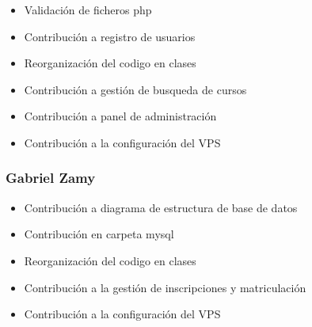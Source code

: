 \documentclass[
]{article}
\providecommand{\tightlist}{%
  \setlength{\itemsep}{0pt}\setlength{\parskip}{0pt}}
\begin{document}
\begin{itemize}
\tightlist
\item
  Validación de ficheros php
\item
  Contribución a registro de usuarios
\item
  Reorganización del codigo en clases
\item
  Contribución a gestión de busqueda de cursos
\item
  Contribución a panel de administración
\item
  Contribución a la configuración del VPS
\end{itemize}

\subsubsection{Gabriel Zamy}\label{gabriel-zamy}

\begin{itemize}
\tightlist
\item
  Contribución a diagrama de estructura de base de datos
\item
  Contribución en carpeta mysql
\item
  Reorganización del codigo en clases
\item
  Contribución a la gestión de inscripciones y matriculación
\item
  Contribución a la configuración del VPS
\end{itemize}
\end{document}
